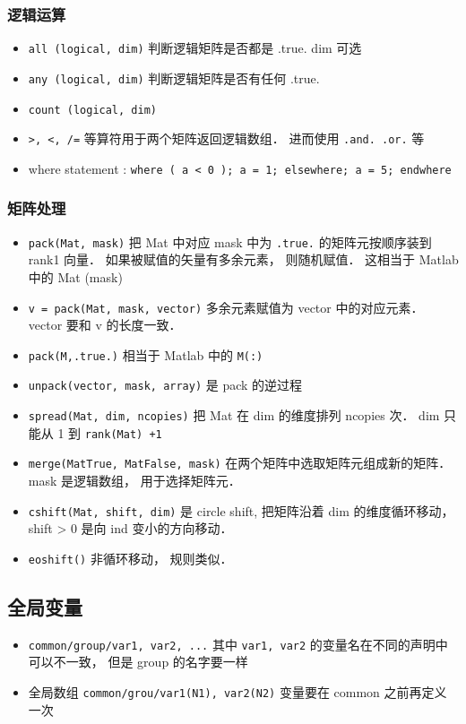 \subsubsection{逻辑运算}
\begin{itemize}
\item \verb`all (logical, dim)` 判断逻辑矩阵是否都是 .true.  dim 可选
\item \verb`any (logical, dim)` 判断逻辑矩阵是否有任何 .true.
\item \verb`count (logical, dim) `
\item \verb`>, <, /=` 等算符用于两个矩阵返回逻辑数组． 进而使用 \verb`.and. .or.` 等
\item where statement : 
\verb`where ( a < 0 ); a = 1; elsewhere; a = 5; endwhere`
\end{itemize}

\subsubsection{矩阵处理}
\begin{itemize}
\item \verb`pack(Mat, mask)` 把 Mat 中对应 mask 中为 \verb|.true.| 的矩阵元按顺序装到 rank1 向量． 如果被赋值的矢量有多余元素， 则随机赋值． 这相当于 Matlab 中的 Mat (mask)
\item \verb`v = pack(Mat, mask, vector)` 多余元素赋值为 vector 中的对应元素． vector 要和 v 的长度一致．
\item \verb`pack(M,.true.)` 相当于 Matlab 中的 \verb|M(:)|
\item \verb`unpack(vector, mask, array)` 是 pack 的逆过程
\item \verb`spread(Mat, dim, ncopies)` 把 Mat 在 dim 的维度排列 ncopies 次． dim 只能从 1 到 \verb`rank(Mat) +1`
\item \verb`merge(MatTrue, MatFalse, mask)` 在两个矩阵中选取矩阵元组成新的矩阵． mask 是逻辑数组， 用于选择矩阵元．
\item \verb`cshift(Mat, shift, dim)` 是 circle shift, 把矩阵沿着 dim 的维度循环移动， shift > 0 是向 ind 变小的方向移动．
\item \verb`eoshift()` 非循环移动， 规则类似．
\end{itemize}

\subsection{全局变量}
\begin{itemize}
\item \verb`common/group/var1, var2, ...` 其中 \verb|var1, var2| 的变量名在不同的声明中可以不一致， 但是 group 的名字要一样
\item 全局数组 \verb`common/grou/var1(N1), var2(N2)` 变量要在 common 之前再定义一次
\end{itemize}

